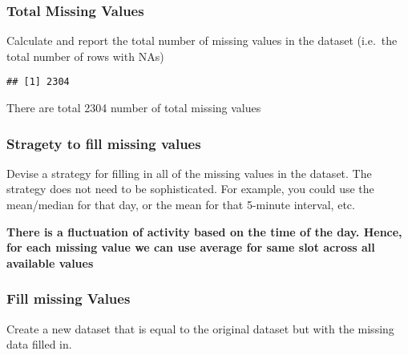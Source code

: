 \documentclass[]{article}
\newenvironment{Shaded}{\begin{snugshade}}{\end{snugshade}}
\newcommand{\CommentTok}[1]{\textcolor[rgb]{0.56,0.35,0.01}{\textit{#1}}}
\newcommand{\DataTypeTok}[1]{\textcolor[rgb]{0.13,0.29,0.53}{#1}}
\newcommand{\KeywordTok}[1]{\textcolor[rgb]{0.13,0.29,0.53}{\textbf{#1}}}
\newcommand{\NormalTok}[1]{#1}
\newcommand{\OperatorTok}[1]{\textcolor[rgb]{0.81,0.36,0.00}{\textbf{#1}}}
\newcommand{\OtherTok}[1]{\textcolor[rgb]{0.56,0.35,0.01}{#1}}
\newcommand{\StringTok}[1]{\textcolor[rgb]{0.31,0.60,0.02}{#1}}
\begin{document}
\hypertarget{total-missing-values}{%
\subsubsection{Total Missing Values}\label{total-missing-values}}

Calculate and report the total number of missing values in the dataset
(i.e.~the total number of rows with NAs)

\begin{Shaded}
\end{Shaded}

\begin{verbatim}
## [1] 2304
\end{verbatim}

There are total 2304 number of total missing values

\hypertarget{stragety-to-fill-missing-values}{%
\subsubsection{Stragety to fill missing
values}\label{stragety-to-fill-missing-values}}

Devise a strategy for filling in all of the missing values in the
dataset. The strategy does not need to be sophisticated. For example,
you could use the mean/median for that day, or the mean for that
5-minute interval, etc.

\textbf{There is a fluctuation of activity based on the time of the day.
Hence, for each missing value we can use average for same slot across
all available values}

\hypertarget{fill-missing-values}{%
\subsubsection{Fill missing Values}\label{fill-missing-values}}

Create a new dataset that is equal to the original dataset but with the
missing data filled in.

\begin{Shaded}
\end{Shaded}
\end{document}
